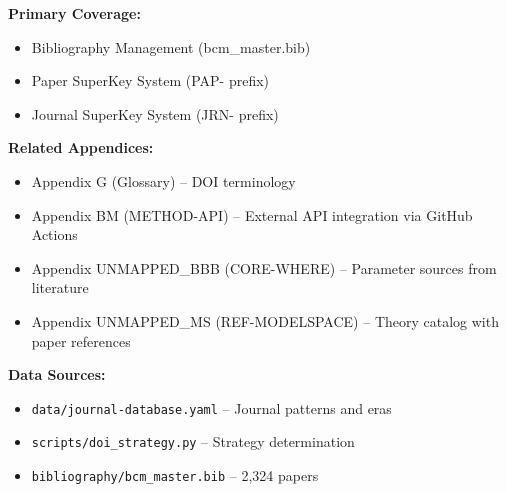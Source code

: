 \begin{tcolorbox}[colback=gray!5, colframe=gray!50, title=Cross-Reference Map]
\small
\textbf{Primary Coverage:}
\begin{itemize}[noitemsep]
    \item Bibliography Management (bcm\_master.bib)
    \item Paper SuperKey System (PAP- prefix)
    \item Journal SuperKey System (JRN- prefix)
\end{itemize}

\textbf{Related Appendices:}
\begin{itemize}[noitemsep]
    \item Appendix G (Glossary) -- DOI terminology
    \item Appendix BM (METHOD-API) -- External API integration via GitHub Actions
    \item Appendix UNMAPPED_BBB (CORE-WHERE) -- Parameter sources from literature
    \item Appendix UNMAPPED_MS (REF-MODELSPACE) -- Theory catalog with paper references
\end{itemize}

\textbf{Data Sources:}
\begin{itemize}[noitemsep]
    \item \texttt{data/journal-database.yaml} -- Journal patterns and eras
    \item \texttt{scripts/doi\_strategy.py} -- Strategy determination
    \item \texttt{bibliography/bcm\_master.bib} -- 2,324 papers
\end{itemize}
\end{tcolorbox}

